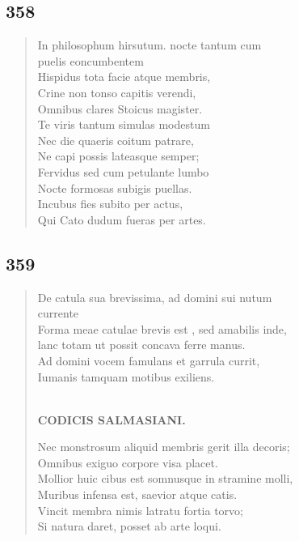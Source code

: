 \documentclass[11pt, a4paper]{report}
\begin{document}
            \subsection*{358}
      \begin{verse}
      In philosophum hirsutum. nocte tantum cum \\ puelis eoncumbentem \\ Hispidus tota facie atque membris, \\ Crine non tonso capitis verendi, \\ Omnibus clares Stoicus magister. \\ Te viris tantum simulas modestum \\ Nec die quaeris coitum patrare, \\ Ne capi possis lateasque semper; \\ Fervidus sed cum petulante lumbo \\ Nocte formosas subigis puellas. \\ Incubus fies subito per actus, \\ Qui Cato dudum fueras per artes. \\ 
      \end{verse}
  
            \subsection*{359}
      \begin{verse}
      De catula sua brevissima, ad domini sui nutum \\ currente \\ Forma meae catulae brevis  \lbrack est \rbrack , sed amabilis inde, \\ lanc totam ut possit concava ferre manus. \\ Ad domini vocem famulans et garrula currit, \\ Iumanis tamquam motibus exiliens. \\ 
        ﻿\pagebreak 
    \begin{center} \textbf{CODICIS SALMASIANI.} \end{center} \marginpar{[281]} Nec monstrosum aliquid membris gerit illa decoris; \\ Omnibus exiguo corpore visa placet. \\ Mollior huic cibus est somnusque in stramine molli, \\ Muribus infensa est, saevior atque catis. \\ Vincit membra nimis latratu fortia torvo; \\ Si natura daret, posset ab arte loqui. \\ 
      \end{verse}
  
\end{document}
